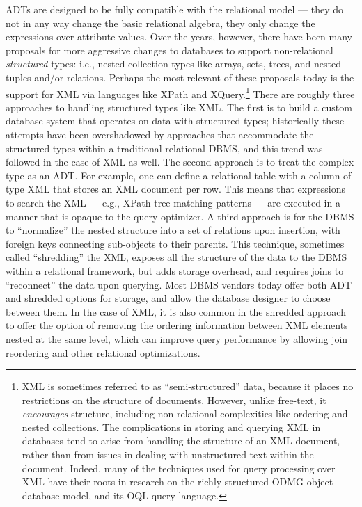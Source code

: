 \documentclass[a4paper,11pt,twoside,openright]{book}
\begin{document}
ADTs are designed to be fully compatible with the relational model ---
they do not in any way change the basic relational algebra, they only
change the expressions over attribute values. Over the years, however,
there have been many proposals for more aggressive changes to databases
to support non-relational \emph{structured} types: i.e., nested
collection types like arrays, sets, trees, and nested tuples and/or
relations. Perhaps the most relevant of these proposals today is the
support for XML via languages like XPath and XQuery.\footnote{XML is sometimes referred to as ``semi-structured'' data, because it
places no restrictions on the structure of documents. However, unlike
free-text, it \emph{encourages} structure, including non-relational
complexities like ordering and nested collections. The complications
in storing and querying XML in databases tend to arise from handling
the structure of an XML document, rather than from issues in dealing
with unstructured text within the document. Indeed, many of the
techniques used for query processing over XML have their roots in
research on the richly structured ODMG object database model, and its
OQL query language.}
There are roughly three approaches to handling structured types like
XML. The first is to build a custom database system that operates on
data with structured types; historically these attempts have been
overshadowed by approaches that accommodate the structured types within
a traditional relational DBMS, and this trend was followed in the case
of XML as well. The second approach is to treat the complex type as an
ADT. For example, one can define a relational table with a column of
type XML that stores an XML document per row. This means that
expressions to search the XML --- e.g., XPath tree-matching patterns ---
are executed in a manner that is opaque to the query optimizer. A third
approach is for the DBMS to ``normalize'' the nested structure into a
set of relations upon insertion, with foreign keys connecting
sub-objects to their parents. This technique, sometimes called
``shredding'' the XML, exposes all the structure of the data to the DBMS
within a relational framework, but adds storage overhead, and requires
joins to ``reconnect'' the data upon querying. Most DBMS vendors today
offer both ADT and shredded options for storage, and allow the database
designer to choose between them. In the case of XML, it is also common
in the shredded approach to offer the option of removing the ordering
information between XML elements nested at the same level, which
can improve query performance by allowing join reordering and other
relational optimizations.
\end{document}

